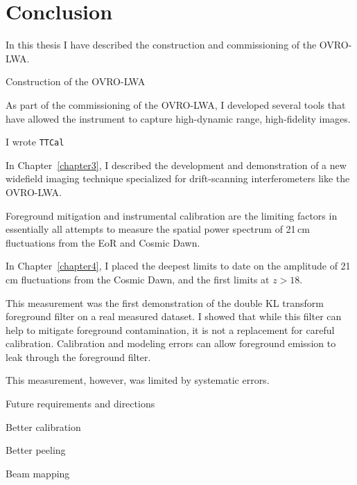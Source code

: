 \chapter{Conclusion}
\label{chapter5}

In this thesis I have described the construction and commissioning of the OVRO-LWA.

Construction of the OVRO-LWA

As part of the commissioning of the OVRO-LWA, I developed several tools that have allowed the
instrument to capture high-dynamic range, high-fidelity images.

I wrote \texttt{TTCal}

In Chapter~\ref{chapter3}, I described the development and demonstration of a new widefield imaging
technique specialized for drift-scanning interferometers like the OVRO-LWA.

Foreground mitigation and instrumental calibration are the limiting factors in essentially all
attempts to measure the spatial power spectrum of 21\,cm fluctuations from the EoR and Cosmic Dawn.

In Chapter~\ref{chapter4}, I placed the deepest limits to date on the amplitude of 21\,cm
fluctuations from the Cosmic Dawn, and the first limits at $z > 18$.

This measurement was the first demonstration of the double KL transform foreground filter on a real
measured dataset. I showed that while this filter can help to mitigate foreground contamination, it
is not a replacement for careful calibration. Calibration and modeling errors can allow foreground
emission to leak through the foreground filter.

This measurement, however, was limited by systematic errors.

Future requirements and directions

Better calibration

Better peeling

Beam mapping

